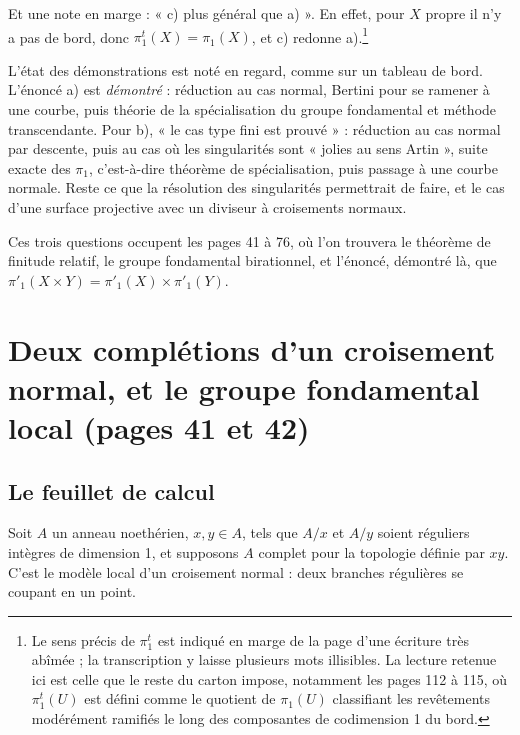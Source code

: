 \documentclass[11pt,a4paper]{article}
\begin{document}
Et une note en marge : « c) plus général que a) ». En effet, pour $X$ propre il
n'y a pas de bord, donc $\pi^{t}_{1}(X) = \pi_{1}(X)$, et c) redonne
a).\footnote{Le sens précis de $\pi_{1}^{t}$ est indiqué en marge de la page
d'une écriture très abîmée ; la transcription y laisse plusieurs mots
illisibles. La lecture retenue ici est celle que le reste du carton impose,
notamment les pages 112 à 115, où $\pi_{1}^{t}(U)$ est défini comme le quotient
de $\pi_{1}(U)$ classifiant les revêtements modérément ramifiés le long des
composantes de codimension 1 du bord.}

L'état des démonstrations est noté en regard, comme sur un tableau de bord. L'énoncé a) est \emph{démontré} : réduction au cas normal,
Bertini pour se ramener à une courbe, puis théorie de la spécialisation du
groupe fondamental et méthode transcendante. Pour b), « le cas type fini est
prouvé » : réduction au cas normal par descente, puis au cas où les
singularités sont « jolies au sens Artin », suite exacte des $\pi_{1}$,
c'est-à-dire théorème de spécialisation, puis passage à une courbe normale.
Reste ce que la résolution des singularités permettrait de faire, et le cas
d'une surface projective avec un diviseur à croisements normaux.

Ces trois questions occupent les pages 41 à 76, où l'on trouvera le théorème de
finitude relatif, le groupe fondamental birationnel, et l'énoncé, démontré
là, que $\pi'_{1}(X \times Y) = \pi'_{1}(X) \times \pi'_{1}(Y)$.

\section*{Deux complétions d'un croisement normal, et le groupe fondamental local (pages 41 et 42)}

\subsection*{Le feuillet de calcul}

Soit $A$ un anneau noethérien, $x, y \in A$, tels que $A/x$ et $A/y$ soient
réguliers intègres de dimension 1, et supposons $A$ complet pour la topologie
définie par $xy$. C'est le modèle local d'un croisement normal : deux branches
régulières se coupant en un point.
\end{document}
